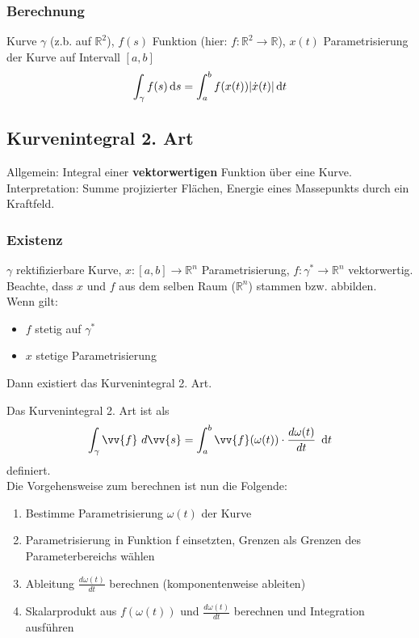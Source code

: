 \subsubsection{Berechnung}
Kurve $\gamma$ (z.b. auf $\mathbb{R}^2$), $f(s)$ Funktion (hier: $f: \mathbb{R}^2 \rightarrow \mathbb{R}$), $x(t)$ Parametrisierung der Kurve auf Intervall $[a,b]$
\begin{equation}
    \int_\gamma f(s) \mathop{}\!\mathrm{d} s = \int_a^b f(x(t)) |\Dot{x}(t)| \mathop{}\!\mathrm{d} t
\end{equation}
\subsection{Kurvenintegral 2. Art}
Allgemein: Integral einer \textbf{vektorwertigen} Funktion über eine Kurve.\\
Interpretation: Summe projizierter Flächen, Energie eines Massepunkts durch ein Kraftfeld.

\subsubsection{Existenz}
$\gamma$ rektifizierbare Kurve, $x: [a,b] \rightarrow \mathbb{R}^n$ Parametrisierung, $f: \gamma^* \rightarrow \mathbb{R}^n$ vektorwertig.\\
Beachte, dass $x$ und $f$ aus dem selben Raum ($\mathbb{R}^n$) stammen bzw. abbilden.\\
Wenn gilt:
\begin{itemize}
    \item $f$ stetig auf $\gamma^*$
    \item $x$ stetige Parametrisierung
\end{itemize}
Dann existiert das Kurvenintegral 2. Art.

\noindent Das Kurvenintegral 2. Art ist als\\
\begin{equation}
    \int_{\gamma} \vv{f} \ d\vv{s} =\int_{a}^{b} \vv{f}(\omega(t))\cdot \frac{d\omega(t)}{dt} \ \diff{t}
\end{equation}
definiert.\\

Die Vorgehensweise zum berechnen ist nun die Folgende:
\begin{enumerate}
    \item Bestimme Parametrisierung $\omega(t)$ der Kurve
    \item Parametrisierung in Funktion f einsetzten, Grenzen als Grenzen des Parameterbereichs wählen
    \item Ableitung $\frac{d\omega (t)}{dt}$ berechnen (komponentenweise ableiten)
    \item Skalarprodukt aus $f(\omega(t))$ und $\frac{d\omega (t)}{dt}$ berechnen und Integration ausführen
\end{enumerate}

